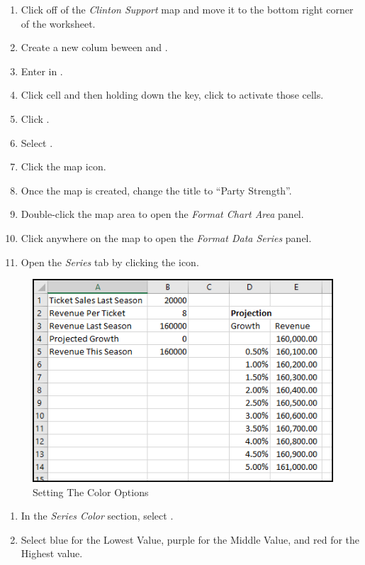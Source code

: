 \begin{enumerate}[resume]
	\item Click off of the \textit{Clinton Support} map and move it to the bottom right corner of the worksheet.
	\item Create a new colum beween  and .
	\item Enter  in .
	\item Click cell  and then holding down the  key, click  to activate those cells.
	\item Click .
	\item Select .
	\item Click the map icon.
	\item Once the map is created, change the title to ``Party Strength''.
	\item Double-click the map area to open the \textit{Format Chart Area} panel.
	\item Click anywhere on the map to open the \textit{Format Data Series} panel.
	\item Open the \textit{Series} tab by clicking the  icon.
	
\end{enumerate}

\begin{figure}[H]
	\centering
	\includegraphics[width=\maxwidth{.50\linewidth}]{gfx/ch08_fig42}
	\caption{Setting The Color Options}
	\label{08:fig42}
\end{figure}

\begin{enumerate}[resume]	
	\item In the \textit{Series Color} section, select .
	\item Select blue for the Lowest Value, purple for the Middle Value, and red for the Highest value.
\end{enumerate}

